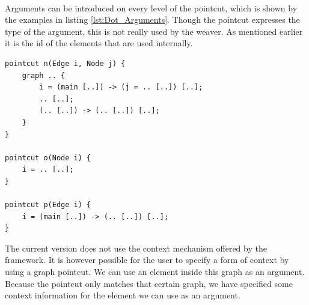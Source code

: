 \documentclass[a4paper]{report}
\begin{document}
\\
Arguments can be introduced on every level of the pointcut, which is shown by the examples in listing \ref{lst:Dot_Arguments}. Though the pointcut expresses the type of the argument, this is not really used by the weaver. As mentioned earlier it is the id of the elements that are used internally.
\begin{lstlisting}[caption=Examples showing the use of arguments., label=lst:Dot_Arguments]
pointcut n(Edge i, Node j) {
	graph .. {
		i = (main [..]) -> (j = .. [..]) [..];
		.. [..];
		(.. [..]) -> (.. [..]) [..];
	}
}

pointcut o(Node i) {
	i = .. [..];
}

pointcut p(Edge i) {
	i = (main [..]) -> (.. [..]) [..];
}
\end{lstlisting}
The current version does not use the context mechanism offered by the framework. It is however possible for the user to specify a form of context by using a graph pointcut. We can use an element inside this graph as an argument. Because the pointcut only matches that certain graph, we have specified some context information for the element we can use as an argument.
\end{document}
